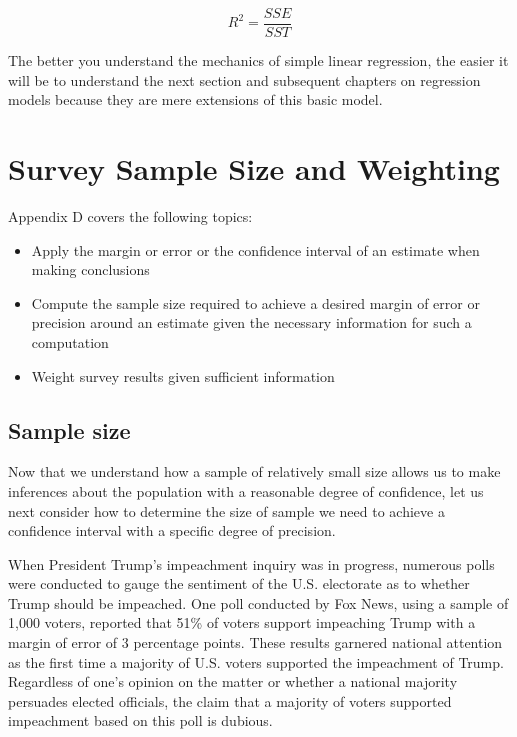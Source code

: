 \documentclass[
]{book}
\providecommand{\tightlist}{%
  \setlength{\itemsep}{0pt}\setlength{\parskip}{0pt}}
\begin{document}
\begin{equation}
R^2 = {\frac{SSE}{SST}}
\label{eq:r2}
\end{equation}

The better you understand the mechanics of simple linear regression, the easier it will be to understand the next section and subsequent chapters on regression models because they are mere extensions of this basic model.

\hypertarget{appendixD}{%
\chapter{Survey Sample Size and Weighting}\label{appendixD}}

Appendix D covers the following topics:

\begin{itemize}
\tightlist
\item
  Apply the margin or error or the confidence interval of an estimate when making conclusions
\item
  Compute the sample size required to achieve a desired margin of error or precision around an estimate given the necessary information for such a computation
\item
  Weight survey results given sufficient information
\end{itemize}

\hypertarget{sample-size}{%
\section{Sample size}\label{sample-size}}

Now that we understand how a sample of relatively small size allows us to make inferences about the population with a reasonable degree of confidence, let us next consider how to determine the size of sample we need to achieve a confidence interval with a specific degree of precision.

When President Trump's impeachment inquiry was in progress, numerous polls were conducted to gauge the sentiment of the U.S. electorate as to whether Trump should be impeached. One poll conducted by Fox News, using a sample of 1,000 voters, reported that 51\% of voters support impeaching Trump with a margin of error of 3 percentage points. These results garnered national attention as the first time a majority of U.S. voters supported the impeachment of Trump. Regardless of one's opinion on the matter or whether a national majority persuades elected officials, the claim that a majority of voters supported impeachment based on this poll is dubious.
\end{document}
